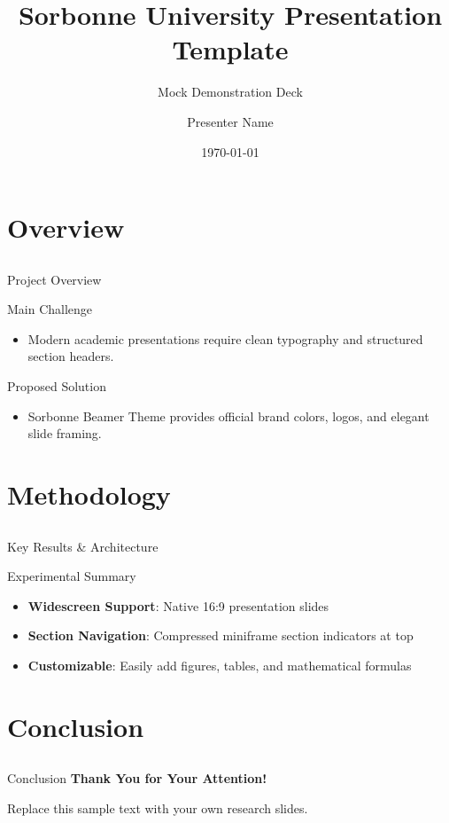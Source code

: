 \documentclass[compress,xcolor=table,aspectratio=169]{beamer}
\title{Sorbonne University \newline Presentation Template}
\subtitle{Mock Demonstration Deck}
\date{\today}
\author{Presenter Name}
\institute{Sorbonne Université}
\begin{document}
\begin{frame}[plain]
	\titlepage
	\setcounter{framenumber}{0}
\end{frame}

\section{Overview} \subsection{}

\begin{frame}{Project Overview}
	
	\begin{alertblock}{Main Challenge}
		\begin{itemize}
			\item Modern academic presentations require clean typography and structured section headers.
		\end{itemize}
	\end{alertblock}
	
	\begin{block}{Proposed Solution}
		\begin{itemize}
			\item Sorbonne Beamer Theme provides official brand colors, logos, and elegant slide framing.
		\end{itemize}
	\end{block}
	
\end{frame}

\section{Methodology} \subsection{}

\begin{frame}{Key Results \& Architecture}
	
	\begin{block}{Experimental Summary}
		\begin{itemize}
			\item \textbf{Widescreen Support}: Native 16:9 presentation slides
			\item \textbf{Section Navigation}: Compressed miniframe section indicators at top
			\item \textbf{Customizable}: Easily add figures, tables, and mathematical formulas
		\end{itemize}
	\end{block}
	
\end{frame}

\section{Conclusion} \subsection{}

\begin{frame}{Conclusion}
	\centering
	\Large \textbf{Thank You for Your Attention!} \par
	\vspace{1.5em}
	\normalsize Replace this sample text with your own research slides.
\end{frame}
\end{document}

